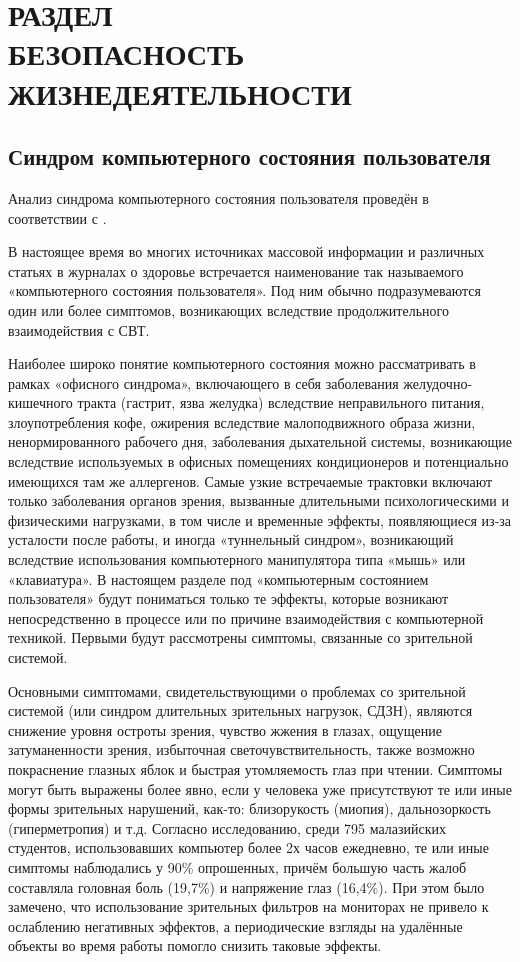 \section {РАЗДЕЛ \\ БЕЗОПАСНОСТЬ ЖИЗНЕДЕЯТЕЛЬНОСТИ}
\subsection {Синдром компьютерного состояния пользователя}
Анализ синдрома компьютерного состояния пользователя проведён в соответствии с \cite{OFFICESYNDROME, COMPUTERVISION, WRISTPOSTURE, CARPALTUNNEL, SANPIN}.

В настоящее время во многих источниках массовой информации и различных статьях в журналах о здоровье встречается наименование так называемого «компьютерного состояния пользователя». Под ним обычно подразумеваются один или более симптомов, возникающих вследствие продолжительного взаимодействия с СВТ. 

Наиболее широко понятие компьютерного состояния можно рассматривать в рамках «офисного синдрома», включающего в себя заболевания желудочно-кишечного тракта  (гастрит, язва желудка) вследствие неправильного питания, злоупотребления кофе, ожирения вследствие малоподвижного образа жизни, ненормированного рабочего дня, заболевания дыхательной системы, возникающие вследствие используемых в офисных помещениях кондиционеров и потенциально имеющихся там же аллергенов\cite{OFFICESYNDROME}. Самые узкие встречаемые трактовки включают только заболевания органов зрения, вызванные длительными психологическими и физическими нагрузками, в том числе и временные эффекты, появляющиеся из-за усталости после работы, и иногда «туннельный синдром», возникающий вследствие использования компьютерного манипулятора типа «мышь» или «клавиатура». В настоящем разделе под «компьютерным состоянием пользователя» будут пониматься только те эффекты, которые возникают непосредственно в процессе или по причине взаимодействия с компьютерной техникой. Первыми будут рассмотрены симптомы, связанные со зрительной системой.

Основными симптомами, свидетельствующими о проблемах со зрительной системой (или синдром длительных зрительных нагрузок, СДЗН), являются снижение уровня остроты зрения, чувство жжения в глазах, ощущение затуманенности зрения, избыточная светочувствительность, также возможно покраснение глазных яблок и быстрая утомляемость глаз при чтении. Симптомы могут быть выражены более явно, если у человека уже присутствуют те или иные формы зрительных нарушений, как-то: близорукость (миопия), дальнозоркость (гиперметропия) и т.д. Согласно исследованию, среди 795 малазийских студентов, использовавших компьютер более 2х часов ежедневно, те или иные симптомы наблюдались у 90\% опрошенных, причём большую часть жалоб составляла головная боль (19,7\%) и напряжение глаз (16,4\%)\cite{COMPUTERVISION}. При  этом было замечено, что использование зрительных фильтров на мониторах не привело к ослаблению негативных эффектов, а периодические взгляды на удалённые объекты во время работы помогло снизить таковые эффекты. 

